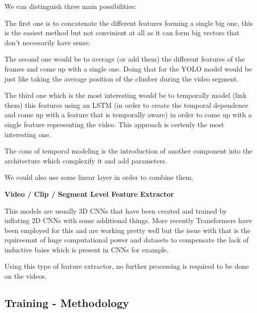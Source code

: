 We can distinguish three main possibilities:

The first one is to concatenate the different features forming a single big one, this is the easiest method but not convinient at all as it can form big vectors that don't necessarily have sense.

The second one would be to average (or add them) the different features of the frames and come up with a single one. Doing that for the YOLO model would be just like taking the average position of the climber during the video segment.

The third one which is the most interesting would be to temporally model (link them) this features using an LSTM (in order to create the temporal dependence and come up with a feature that is temporally aware) in order to come up with a single feature representing the video. This approach is certenly the most interesting one.

The cons of temporal modeling is the introduction of another component into the architecture which complexify it and add parameters.

We could also use some linear layer in order to combine them.


\textbf{Video / Clip / Segment Level Feature Extractor}

This models are usually 3D CNNs that have been created and trained by inflating 2D CNNs with some additional things. More recently Transformers have been employed for this and are working pretty well but the issue with that is the rquireemnt of huge computational power and datasets to compensate the lack of inductive baies which is present in CNNs for example.

Using this type of feature extractor, no further processing is required to be done on the videos.

\subsection{Training - Methodology}

